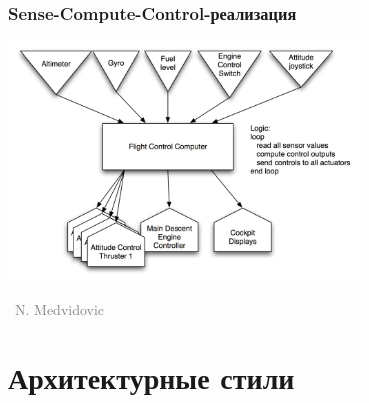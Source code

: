 \documentclass[xetex,mathserif,serif]{beamer}
\newcommand{\attribution}[1] {
    \vspace{-5mm}\begin{flushright}\begin{scriptsize}\textcolor{gray}{\textcopyright\, #1}\end{scriptsize}\end{flushright}
}
\begin{document}
    \begin{frame}
        \frametitle{Sense-Compute-Control-реализация}
        \begin{center}
            \includegraphics[width=0.7\textwidth]{senseComputeControlLunarLander.png}
            \attribution{N. Medvidovic}
        \end{center}
    \end{frame}

    \section{Архитектурные стили}
\end{document}
